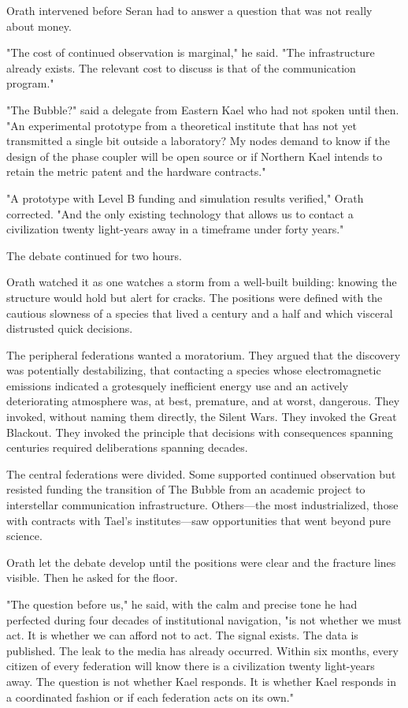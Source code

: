 \documentclass[11pt,a5paper,twoside]{book}
\begin{document}
Orath intervened before Seran had to answer a question that was not really about money.

"The cost of continued observation is marginal," he said. "The infrastructure already exists. The relevant cost to discuss is that of the communication program."

"The Bubble?" said a delegate from Eastern Kael who had not spoken until then. "An experimental prototype from a theoretical institute that has not yet transmitted a single bit outside a laboratory? My nodes demand to know if the design of the phase coupler will be open source or if Northern Kael intends to retain the metric patent and the hardware contracts."

"A prototype with Level B funding and simulation results verified," Orath corrected. "And the only existing technology that allows us to contact a civilization twenty light-years away in a timeframe under forty years."

The debate continued for two hours.

Orath watched it as one watches a storm from a well-built building: knowing the structure would hold but alert for cracks. The positions were defined with the cautious slowness of a species that lived a century and a half and which visceral distrusted quick decisions.

The peripheral federations wanted a moratorium. They argued that the discovery was potentially destabilizing, that contacting a species whose electromagnetic emissions indicated a grotesquely inefficient energy use and an actively deteriorating atmosphere was, at best, premature, and at worst, dangerous. They invoked, without naming them directly, the Silent Wars. They invoked the Great Blackout. They invoked the principle that decisions with consequences spanning centuries required deliberations spanning decades.

The central federations were divided. Some supported continued observation but resisted funding the transition of The Bubble from an academic project to interstellar communication infrastructure. Others—the most industrialized, those with contracts with Tael’s institutes—saw opportunities that went beyond pure science.

Orath let the debate develop until the positions were clear and the fracture lines visible. Then he asked for the floor.

"The question before us," he said, with the calm and precise tone he had perfected during four decades of institutional navigation, "is not whether we must act. It is whether we can afford not to act. The signal exists. The data is published. The leak to the media has already occurred. Within six months, every citizen of every federation will know there is a civilization twenty light-years away. The question is not whether Kael responds. It is whether Kael responds in a coordinated fashion or if each federation acts on its own."
\end{document}
